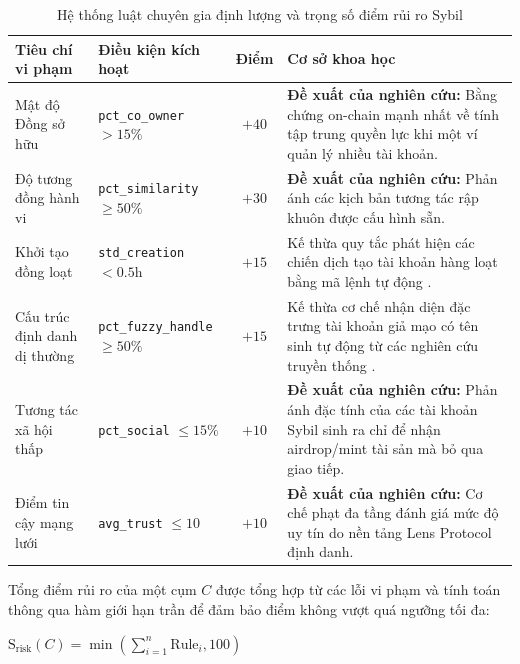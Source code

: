 \begin{table}[H]
    \centering
    \caption{Hệ thống luật chuyên gia định lượng và trọng số điểm rủi ro Sybil}
    \label{tab:heuristics}
    \renewcommand{\arraystretch}{1.4}
    \setlength{\tabcolsep}{6pt}
    \begin{tabular}{|p{3cm}|p{3.5cm}|c|p{6.4cm}|}
        \hline
        \textbf{Tiêu chí vi phạm} & \textbf{Điều kiện kích hoạt} & \textbf{Điểm} & \textbf{Cơ sở khoa học} \\
        \hline
        Mật độ Đồng sở hữu & \texttt{pct\_co\_owner} $> 15\%$ & $+40$ & \textbf{Đề xuất của nghiên cứu:} Bằng chứng on-chain mạnh nhất về tính tập trung quyền lực khi một ví quản lý nhiều tài khoản. \\
        \hline
        Độ tương đồng hành vi & \texttt{pct\_similarity} $\geq 50\%$ & $+30$ & \textbf{Đề xuất của nghiên cứu:} Phản ánh các kịch bản tương tác rập khuôn được cấu hình sẵn. \\
        \hline
        Khởi tạo đồng loạt & \texttt{std\_creation} $< 0.5$h & $+15$ & Kế thừa quy tắc phát hiện các chiến dịch tạo tài khoản hàng loạt bằng mã lệnh tự động \cite{al2017sybil}. \\
        \hline
        Cấu trúc định danh dị thường & \texttt{pct\_fuzzy\_handle} $\geq 50\%$ & $+15$ & Kế thừa cơ chế nhận diện đặc trưng tài khoản giả mạo có tên sinh tự động từ các nghiên cứu truyền thống \cite{al2017sybil}. \\
        \hline
        Tương tác xã hội thấp & \texttt{pct\_social} $\leq 15\%$ & $+10$ & \textbf{Đề xuất của nghiên cứu:} Phản ánh đặc tính của các tài khoản Sybil sinh ra chỉ để nhận airdrop/mint tài sản mà bỏ qua giao tiếp. \\
        \hline
        Điểm tin cậy mạng lưới & \texttt{avg\_trust} $\leq 10$ & $+10$ & \textbf{Đề xuất của nghiên cứu:} Cơ chế phạt đa tầng đánh giá mức độ uy tín do nền tảng Lens Protocol định danh. \\
        \hline
    \end{tabular}
\end{table}

Tổng điểm rủi ro của một cụm $C$ được tổng hợp từ các lỗi vi phạm và tính toán thông qua hàm giới hạn trần để đảm bảo điểm không vượt quá ngưỡng tối đa:\vspace{0.2cm}

\begin{center}
\(
    \text{S}_{\text{risk}}(C) = \min \left( \sum_{i=1}^{n} \text{Rule}_i, 100 \right)
\)
\end{center}

